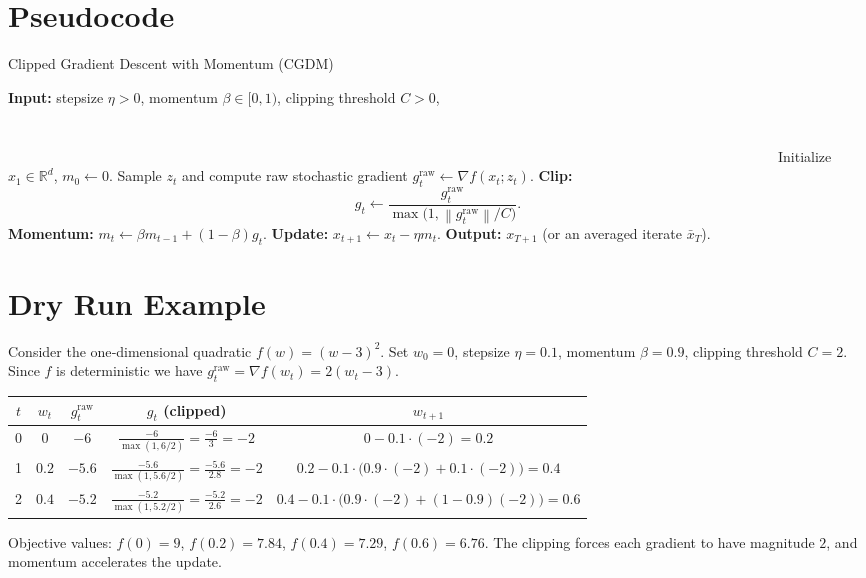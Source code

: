 \documentclass{article}
\newcommand{\R}{\mathbb{R}}
\newcommand{\norm}[1]{\left\|#1\right\|}
\begin{document}
\section*{Pseudocode}
\begin{algorithm}[H]
\caption{Clipped Gradient Descent with Momentum (CGDM)}
\begin{algorithmic}[1]
\STATE \textbf{Input:} stepsize $\eta>0$, momentum $\beta\in[0,1)$, clipping threshold $C>0$,\\
\ \ \ \ \ \ \ \ \ \ \ \ \ \ \ \ \ \ \ \ \ \ \ \ \ \ \ \ \ \ \ \ \ \ \ \ \ \ \ \ \ \ \ \ \ \ \ \ \ \ \ \ \ \ \ \ \ \ \ \ \ \ \ \ \ \ \ \ \ \ \ \ \ \ \ \ \ \ \ \ \ \ \ \ \ \ \ \ \ \ \ \ \ \ \ \ \ \ \ \ \ \ \ \ \ \ \ \ \ \ \ \ \ \ \ \ \ \ \ \ \ \ \ \ \ \ \ \ \ \ \ \ \ \ \ \ \ \ \ \ \ \ \ \ \ \ \ \ \ \ \ \ \ \ \ \ \ \ \ \ \ \ \ \ \ \ \ \ \ \ \ \ \ \ \ \ \ \ \ \ \ \ \ \ \ \ \ \ \ \ \ \ \ \ \ \ \ \ \ \ \ \ \ \ \ \ \ \ \ \ \ \ \ \ \ \ \ \ \ \ \ \ \ \ \ \ \ \ \ \ \ \ \ \ \ \ \ \ \ \ \ \ \ \ \ \ \ \ \ \ \ \ \ \ \ \ \ \ \ \ \ \ \ \ \ \ \ \ \ \ \ \ \ \ \ \ \ \ \ \ \ \ \ \ \ \ \ \ \ \ \ \ \ \ \ \ \ \ \ \ \ \ \ \ \ \ \ \ \ \ \ \ \ \ \ \ \ \ \ \ \ \ \ \ \ \ \ \ \ \ \ \ \ \ \ \ \ \ \ \ \ \ \ \ \ \ \ \ \ \ \ \ \ \ 
\STATE Initialize $x_1\in\R^d$, $m_0\gets 0$.
    \STATE Sample $z_t$ and compute raw stochastic gradient $g_t^{\text{raw}}\gets\nabla f(x_t;z_t)$.
    \STATE \textbf{Clip:}
    \[
    g_t \gets \frac{g_t^{\text{raw}}}{\max\!\bigl(1,\norm{g_t^{\text{raw}}}/C\bigr)} .
    \]
    \STATE \textbf{Momentum:} $m_t \gets \beta m_{t-1}+(1-\beta)g_t$.
    \STATE \textbf{Update:} $x_{t+1}\gets x_t-\eta m_t$.
\ENDFOR
\STATE \textbf{Output:} $x_{T+1}$ (or an averaged iterate $\bar x_T$).
\end{algorithmic}
\end{algorithm}

\section*{Dry Run Example}
Consider the one‑dimensional quadratic $f(w)=(w-3)^2$.  
Set $w_0=0$, stepsize $\eta=0.1$, momentum $\beta=0.9$, clipping threshold $C=2$.
Since $f$ is deterministic we have $g_t^{\text{raw}}=\nabla f(w_t)=2(w_t-3)$.

\begin{center}
\begin{tabular}{c|c|c|c|c}
$t$ & $w_t$ & $g_t^{\text{raw}}$ & $g_t$ (clipped) & $w_{t+1}$ \\ \hline
0 & $0$ & $-6$ & $\displaystyle\frac{-6}{\max(1,6/2)}=\frac{-6}{3}=-2$ & $0-0.1\cdot(-2)=0.2$ \\[4pt]
1 & $0.2$ & $-5.6$ & $\displaystyle\frac{-5.6}{\max(1,5.6/2)}=\frac{-5.6}{2.8}=-2$ & $0.2-0.1\cdot\bigl(0.9\cdot(-2)+0.1\cdot(-2)\bigr)=0.4$ \\[4pt]
2 & $0.4$ & $-5.2$ & $\displaystyle\frac{-5.2}{\max(1,5.2/2)}=\frac{-5.2}{2.6}=-2$ & $0.4-0.1\cdot\bigl(0.9\cdot(-2)+(1-0.9)(-2)\bigr)=0.6$
\end{tabular}
\end{center}
Objective values: $f(0)=9$, $f(0.2)=7.84$, $f(0.4)=7.29$, $f(0.6)=6.76$.
The clipping forces each gradient to have magnitude $2$, and momentum accelerates the update.
\end{document}
